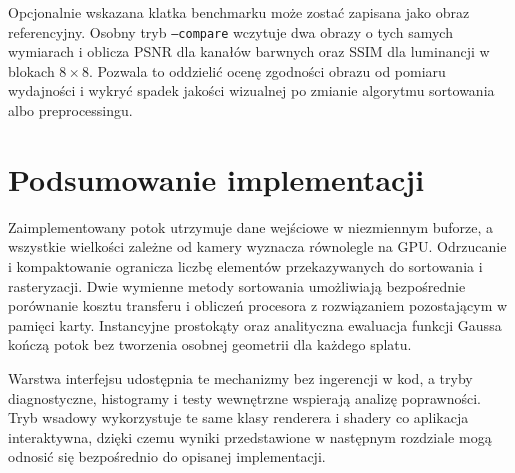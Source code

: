 Opcjonalnie wskazana klatka benchmarku może zostać zapisana jako obraz referencyjny. Osobny tryb \texttt{--compare} wczytuje dwa obrazy o tych samych wymiarach i oblicza PSNR dla kanałów barwnych oraz SSIM dla luminancji w blokach $8\times8$. Pozwala to oddzielić ocenę zgodności obrazu od pomiaru wydajności i wykryć spadek jakości wizualnej po zmianie algorytmu sortowania albo preprocessingu.

\section{Podsumowanie implementacji}
\label{sec:impl_podsumowanie}

Zaimplementowany potok utrzymuje dane wejściowe w niezmiennym buforze, a wszystkie wielkości zależne od kamery wyznacza równolegle na GPU. Odrzucanie i kompaktowanie ogranicza liczbę elementów przekazywanych do sortowania i rasteryzacji. Dwie wymienne metody sortowania umożliwiają bezpośrednie porównanie kosztu transferu i obliczeń procesora z rozwiązaniem pozostającym w pamięci karty. Instancyjne prostokąty oraz analityczna ewaluacja funkcji Gaussa kończą potok bez tworzenia osobnej geometrii dla każdego splatu.

Warstwa interfejsu udostępnia te mechanizmy bez ingerencji w kod, a tryby diagnostyczne, histogramy i testy wewnętrzne wspierają analizę poprawności. Tryb wsadowy wykorzystuje te same klasy renderera i shadery co aplikacja interaktywna, dzięki czemu wyniki przedstawione w następnym rozdziale mogą odnosić się bezpośrednio do opisanej implementacji.